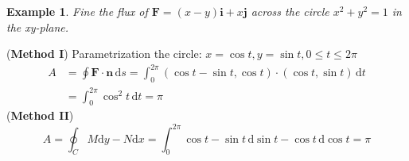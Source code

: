 \documentclass[a4paper,12pt]{article}
\newtheorem{example}{Example}             %
\begin{document}
\begin{CJK}{UTF8}{gbsn}
\begin{example}
    Fine the flux of $\bm{F} = (x-y)\bm{i}+x\bm{j}$ across the circle
    $x^2 + y^2 =1$ in the xy-plane.
\end{example}
(\textbf{Method I}) Parametrization the circle: $x = \cos t, y = \sin t, 0 \le t \le 2\pi$ 
\[
    \begin{split}
    A & = \oint\bm{F}\cdot\bm{n}\, \mathrm{d}s 
      = \int_0^{2\pi} \left(\cos t - \sin t, \cos t\right)\cdot\left(\cos t, \sin t\right)
        \, \mathrm{d}t\\
        & = \int_0^{2\pi}\cos^2t\,\mathrm{d}t = \pi
    \end{split}
\]
(\textbf{Method II}) 
\[
    A = \oint_C M\mathrm{d}y - N\mathrm{d}x
      = \int_0^{2\pi} \cos t - \sin t \, \mathrm{d}\sin t - \cos t\, \mathrm{d}\cos t
      = \pi
    \]


\end{CJK}
\end{document}
